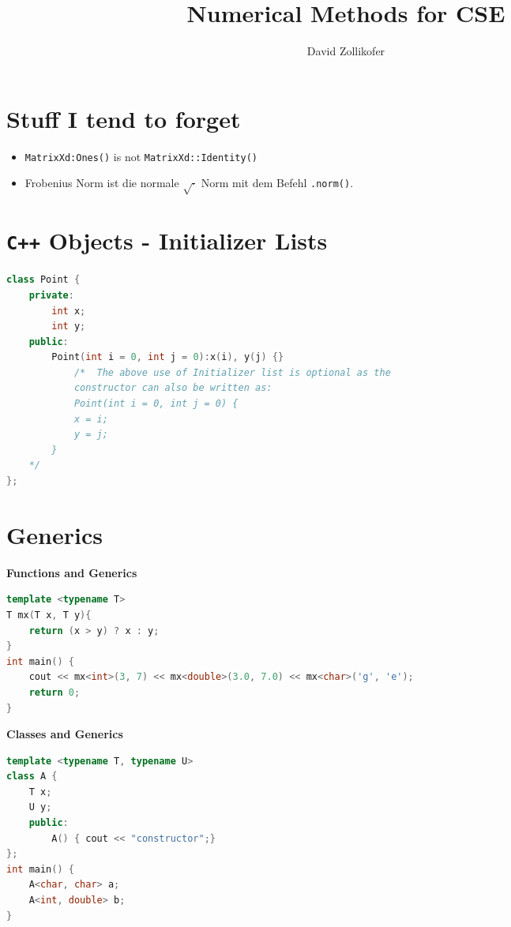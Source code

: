 \documentclass{sciposter}
\title{\huge{Numerical Methods for CSE}}
\author{\large{David Zollikofer}}
\newcommand{\psection}[1]{\par \textbf{\large#1}}
\begin{document}

\maketitle



\begin{multicols}{2}
	
\section*{Stuff I tend to forget}

\begin{itemize}
	\item \texttt{MatrixXd:Ones()} is not \texttt{MatrixXd::Identity()}
	\item Frobenius Norm ist die normale $\sqrt{\cdot}$ Norm mit dem Befehl \texttt{.norm()}.
\end{itemize}

\section*{\texttt{C++} Objects - Initializer Lists}



\begin{lstlisting}[language=c++]
class Point { 
	private: 
		int x; 
		int y; 
	public: 
		Point(int i = 0, int j = 0):x(i), y(j) {}  
			/*  The above use of Initializer list is optional as the  
			constructor can also be written as: 
			Point(int i = 0, int j = 0) { 
			x = i; 
			y = j; 
		} 
	*/    
}; 
\end{lstlisting}

\section*{Generics}

\psection{Functions and Generics}
\begin{lstlisting}[language=c++]
template <typename T> 
T mx(T x, T y){ 
	return (x > y) ? x : y; 
} 
int main() { 
	cout << mx<int>(3, 7) << mx<double>(3.0, 7.0) << mx<char>('g', 'e'); 
	return 0; 
} 

\end{lstlisting}

\psection{Classes and Generics}
\begin{lstlisting}[language=c++]
template <typename T, typename U> 
class A { 
	T x; 
	U y; 	
	public: 
		A() { cout << "constructor";} 
}; 
int main() { 
	A<char, char> a; 
	A<int, double> b; 
} 
\end{lstlisting}





\end{multicols}
\end{document}
